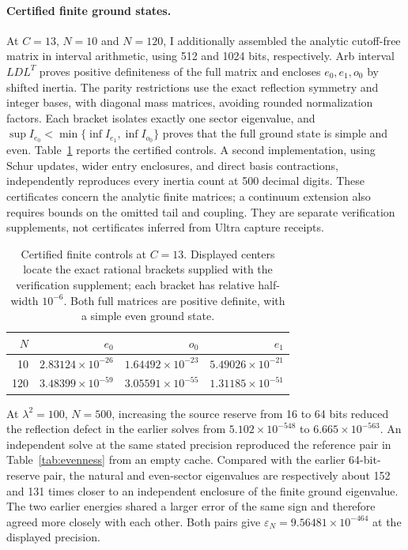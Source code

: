 \documentclass[11pt,a4paper]{article}
\begin{document}
\paragraph{Certified finite ground states.}
At $C=13$, $N=10$ and $N=120$, I additionally assembled the analytic
cutoff-free matrix in interval arithmetic, using 512 and 1024 bits,
respectively. Arb interval $LDL^T$ proves positive definiteness of
the full matrix and encloses $e_0,e_1,o_0$ by shifted inertia.
The parity restrictions use the exact reflection symmetry and integer
bases, with diagonal mass matrices, avoiding rounded normalization
factors. Each bracket isolates exactly one sector eigenvalue, and
$\sup I_{e_0}<\min\{\inf I_{e_1},\inf I_{o_0}\}$ proves that the
full ground state is simple and even. Table~\ref{tab:finite_certificates}
reports the certified controls. A second implementation, using
Schur updates, wider entry enclosures, and direct basis contractions,
independently reproduces every inertia count at 500 decimal digits.
These certificates concern the analytic finite matrices; a continuum
extension also requires bounds on the omitted tail and coupling.
They are separate verification supplements, not certificates inferred
from Ultra capture receipts.

\begin{table}[!htbp]
\centering
\caption{Certified finite controls at $C=13$. Displayed centers locate
the exact rational brackets supplied with the verification supplement;
each bracket has relative half-width $10^{-6}$. Both full matrices
are positive definite, with a simple even ground state.}
\label{tab:finite_certificates}
\begin{tabular}{@{}rrrr@{}}
\toprule
$N$ & $e_0$ & $o_0$ & $e_1$ \\
\midrule
10 & $2.83124\times10^{-26}$ & $1.64492\times10^{-23}$ & $5.49026\times10^{-21}$ \\
120 & $3.48399\times10^{-59}$ & $3.05591\times10^{-55}$ & $1.31185\times10^{-51}$ \\
\bottomrule
\end{tabular}
\end{table}

At $\lambda^2{=}100$, $N{=}500$, increasing the source reserve from
16 to 64 bits reduced the reflection defect in the earlier solves
from $5.102\times10^{-548}$ to $6.665\times10^{-563}$.
An independent solve at the same stated precision reproduced the
reference pair in Table~\ref{tab:evenness} from an empty cache.
Compared with the earlier 64-bit-reserve pair, the natural and
even-sector eigenvalues are respectively about 152 and 131 times
closer to an independent enclosure of the finite ground eigenvalue.
The two earlier energies shared a larger error of the same sign and
therefore agreed more closely with each other. Both pairs give
$\varepsilon_N=9.56481\times10^{-464}$ at the displayed precision.
\end{document}
